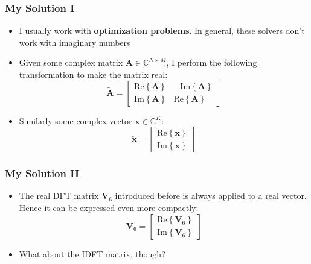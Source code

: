 \documentclass{beamer}
\begin{document}
\begin{frame}
\frametitle{My Solution I}
\begin{itemize}
    \item I usually work with \textbf{optimization problems}. In general, these solvers don't work with imaginary numbers
    \item Given some complex matrix $\mathbf{A}\in\mathbb{C}^{N\times M}$, I perform the following transformation to make the matrix real:
    \begin{equation}
        \tilde{\mathbf{A}} = \begin{bmatrix}
            \mathrm{Re}\left\{\mathbf{A}\right\} & -\mathrm{Im}\left\{\mathbf{A}\right\} \\
            \mathrm{Im}\left\{\mathbf{A}\right\} & \mathrm{Re}\left\{\mathbf{A}\right\} 
        \end{bmatrix} 
    \end{equation}
    \item Similarly some complex vector $\mathbf{x}\in\mathbb{C}^{K}$:
    \begin{equation}
        \tilde{\mathbf{x}} = \begin{bmatrix}
            \mathrm{Re}\left\{\mathbf{x}\right\}\\
            \mathrm{Im}\left\{\mathbf{x}\right\}
        \end{bmatrix} 
    \end{equation}
\end{itemize}
\end{frame}

\begin{frame}
\frametitle{My Solution II}
\begin{itemize}
    \item The real DFT matrix $\mathbf{V}_6$ introduced before is always applied to a real vector. Hence it can be expressed even more compactly:
    \begin{equation}
        \tilde{\mathbf{V}}_6 = \begin{bmatrix}
            \mathrm{Re}\left\{\mathbf{V}_6\right\} \\
            \mathrm{Im}\left\{\mathbf{V}_6\right\} 
        \end{bmatrix} 
    \end{equation}
    \item What about the IDFT matrix, though?
\end{itemize}
\end{frame}
\end{document}
